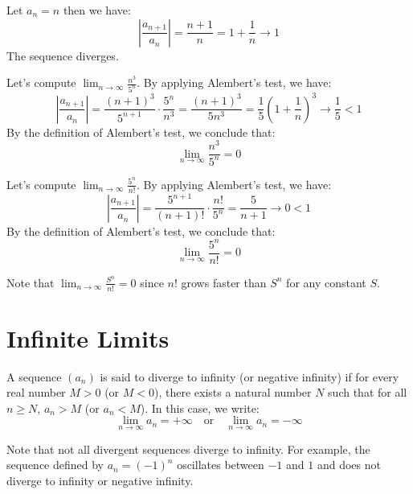 \begin{eg}
    Let $a_n = n$ then we have:
    \[ \left| \frac{a_{n+1}}{a_n} \right| = \frac{n + 1}{n} = 1 + \frac{1}{n} \to 1 \]
    The sequence diverges.
\end{eg}
\begin{eg}
    Let's compute $\lim_{n \to \infty} \frac{n^3}{5^n}$. By applying Alembert's test, we have:
    \[ \left| \frac{a_{n+1}}{a_n} \right| = \frac{(n + 1)^3}{5^{n + 1}} \cdot \frac{5^n}{n^3} = \frac{(n + 1)^3}{5 n^3} = \frac{1}{5} \left(1 + \frac{1}{n}\right)^3 \to \frac{1}{5} < 1 \]
    By the definition of Alembert's test, we conclude that:
    \[ \lim_{n \to \infty} \frac{n^3}{5^n} = 0 \]
\end{eg}
\begin{eg}
    Let's compute $\lim_{n \to \infty} \frac{5^n}{n!}$. By applying Alembert's test, we have:
    \[ \left| \frac{a_{n+1}}{a_n} \right| = \frac{5^{n + 1}}{(n + 1)!} \cdot \frac{n!}{5^n} = \frac{5}{n + 1} \to 0 < 1 \]
    By the definition of Alembert's test, we conclude that:
    \[ \lim_{n \to \infty} \frac{5^n}{n!} = 0 \]
\end{eg}
Note that $\lim_{n \to \infty} \frac{S^n}{n!} = 0$ since $n!$ grows faster than $S^n$ for any constant $S$.

\section{Infinite Limits}
\begin{definition}
    A sequence \( (a_n) \) is said to diverge to infinity (or negative infinity) if for every real number \( M > 0 \) (or \( M < 0 \)), there exists a natural number \( N \) such that for all \( n \geq N \), \( a_n > M \) (or \( a_n < M \)). In this case, we write:
    \[ \lim_{n \to \infty} a_n = +\infty \quad \text{or} \quad \lim_{n \to \infty} a_n = -\infty \]
\end{definition}
Note that not all divergent sequences diverge to infinity. For example, the sequence defined by \( a_n = (-1)^n \) oscillates between $-1$ and $1$ and does not diverge to infinity or negative infinity.

